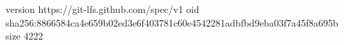 version https://git-lfs.github.com/spec/v1
oid sha256:8866584ca4e659b02ed3e6f403781c60e4542281adbfbd9eba03f7a45f8a695b
size 4222
